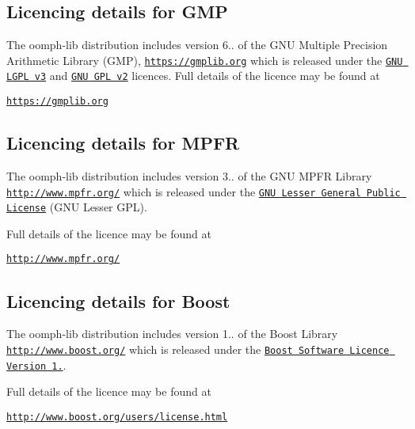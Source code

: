 \subsection*{Licencing details for G\+MP}

The {\ttfamily oomph-\/lib} distribution includes version 6.. of the G\+NU Multiple Precision Arithmetic Library (G\+MP), \href{https://gmplib.org}{\tt https\+://gmplib.\+org} which is released under the \href{https://www.gnu.org/licenses/lgpl.html}{\tt G\+NU L\+G\+PL v3} and \href{https://www.gnu.org/licenses/gpl-2.0.html}{\tt G\+NU G\+PL v2} licences. Full details of the licence may be found at \begin{center} \href{https://gmplib.org}{\tt https\+://gmplib.\+org} \end{center} 





\subsection*{Licencing details for M\+P\+FR}

The {\ttfamily oomph-\/lib} distribution includes version 3.. of the G\+NU M\+P\+FR Library \href{http://www.mpfr.org/}{\tt http\+://www.\+mpfr.\+org/} which is released under the \href{http://www.gnu.org/copyleft/lesser.html}{\tt G\+NU Lesser General Public License} (G\+NU Lesser G\+PL).

Full details of the licence may be found at \begin{center} \href{http://www.mpfr.org/}{\tt http\+://www.\+mpfr.\+org/} \end{center} 





\subsection*{Licencing details for Boost}

The {\ttfamily oomph-\/lib} distribution includes version 1.. of the Boost Library \href{http://www.boost.org/}{\tt http\+://www.\+boost.\+org/} which is released under the \href{http://www.boost.org/LICENSE_1_0.txt}{\tt Boost Software Licence Version 1.}.

Full details of the licence may be found at \begin{center} \href{http://www.boost.org/users/license.html}{\tt http\+://www.\+boost.\+org/users/license.\+html} \end{center} 





